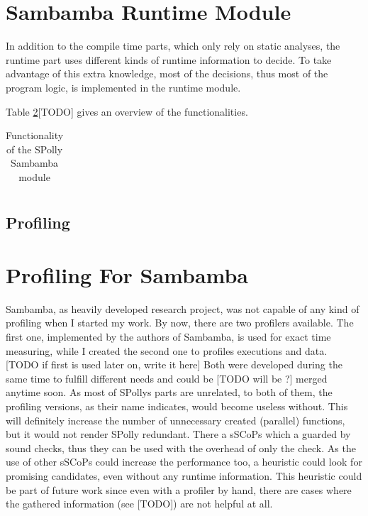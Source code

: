 \section{Sambamba Runtime Module}

In addition to the compile time parts, which only rely on static analyses,
the runtime part uses different kinds of runtime information to decide. 
To take advantage of this extra knowledge, most of the decisions, thus most of
the program logic, is implemented in the runtime module. 


Table \ref{}[TODO] gives an overview of the functionalities.


\begin{table}[htbp]
  \caption{Functionality of the SPolly Sambamba module}
  \begin{tabular}{| l |}
    \hline
    
    \hline
    \hline

    \hline
  \end{tabular}
\end{table}



\subsection{Profiling}


\section{Profiling For Sambamba}

Sambamba, as heavily developed research project, was not capable of any kind
of profiling when I started my work. By now, there are two profilers available.
The first one, implemented by the authors of Sambamba, 
is used for exact time measuring, while I created the second one to profiles
executions and data.
[TODO if first is used later on, write it here] Both were
developed during the same time to fulfill different needs and could be
[TODO will be ?]  merged anytime soon. 
As most of SPollys parts are unrelated, to both of them, 
the profiling versions, as their name indicates, would become useless without.
This will definitely increase the number of unnecessary created (parallel) 
functions, but it would not render SPolly redundant.
There a sSCoPs which a guarded by sound checks, thus they can be used with the
overhead of only the check. As the use of other sSCoPs could increase the 
performance too, a heuristic could look for promising candidates, even without
any runtime information. This heuristic could be part of future work since even
with a profiler by hand, there are cases where the gathered information
(see [TODO]) are not helpful at all.



